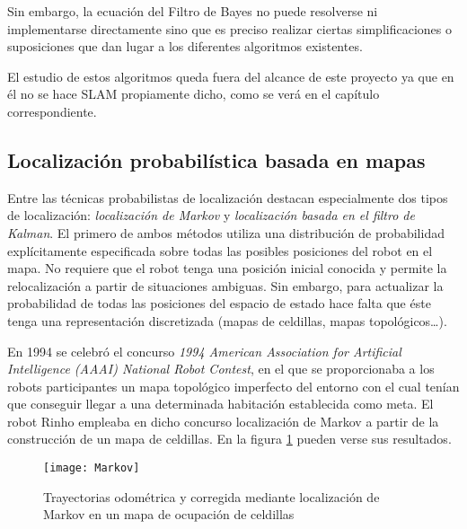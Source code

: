 Sin embargo, la ecuación del Filtro de Bayes no puede resolverse ni implementarse directamente sino que es preciso realizar ciertas simplificaciones o suposiciones que dan lugar a los diferentes algoritmos existentes.

El estudio de estos algoritmos queda fuera del alcance de este proyecto ya que en él no se hace SLAM propiamente dicho, como se verá en el capítulo correspondiente. %

\subsection {Localización probabilística basada en mapas}

Entre las técnicas probabilistas de localización destacan especialmente dos tipos de localización: \emph{localización de Markov} y \emph{localización basada en el filtro de Kalman}. El primero de ambos métodos utiliza una distribución de probabilidad explícitamente especificada sobre todas las posibles posiciones del robot en el mapa. No requiere que el robot tenga una posición inicial conocida y permite la relocalización a partir de situaciones ambiguas. Sin embargo, para actualizar la probabilidad de todas las posiciones del espacio de estado hace falta que éste tenga una representación discretizada (mapas de celdillas, mapas topológicos\ldots).

En 1994 se celebró el concurso \emph{1994 American Association for Artificial Intelligence (AAAI) National Robot Contest}, en el que se proporcionaba a los robots participantes un mapa topológico imperfecto del entorno con el cual tenían que conseguir llegar a una determinada habitación establecida como meta. El robot Rinho empleaba en dicho concurso localización de Markov a partir de la construcción de un mapa de celdillas. En la figura \ref{fg:MarkovGrid} pueden verse sus resultados.

\begin{figure}[h]
  \centering\texttt{[image: Markov]}\\
  \caption{\cite{Fox99} Trayectorias odométrica y corregida mediante localización de Markov en un mapa de ocupación de celdillas}\label{fg:MarkovGrid}
\end{figure}

